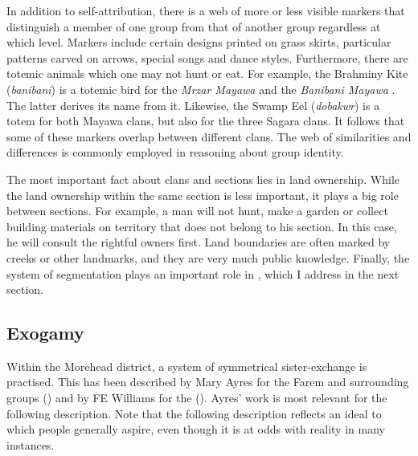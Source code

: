 In addition to self-attribution, there is a web of more or less visible markers that distinguish a member of one group from that of another group regardless at which level. Markers include certain designs printed on grass skirts, particular patterns carved on arrows, special songs and dance styles. Furthermore, there are totemic animals which one may not hunt or eat. For example, the Brahminy Kite (\emph{banibani}) is a totemic bird for the \emph{Mrzar Mayawa}  and the \emph{Banibani Mayawa} . The latter derives its name from it. Likewise, the Swamp Eel (\emph{dobakwr}) is a totem for both Mayawa clans, but also for the three Sagara clans. It follows that some of these markers overlap between different clans. The web of similarities and differences is commonly employed in reasoning about group identity.%

The most important fact about clans and sections lies in land ownership. While the land ownership within the same section is less important, it plays a big role between sections. For example, a man will not hunt, make a garden or collect building materials on territory that does not belong to his section. In this case, he will consult the rightful owners first. Land boundaries are often marked by creeks or other landmarks, and they are very much public knowledge. Finally, the system of segmentation plays an important role in , which I address in the next section.

\subsection{Exogamy}\label{exogamy}

Within the Morehead district, a system of symmetrical sister-exchange is practised. This has been described by Mary Ayres for the Farem and surrounding groups (\citeyear{Ayres:ws}) and by FE Williams for the  (\citeyear{Williams:1936transfly}). Ayres' work is most relevant for the following description. Note that the following description reflects an ideal to which people generally aspire, even though it is at odds with reality in many instances.%

